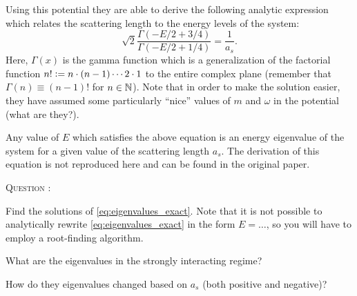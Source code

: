 \documentclass[
  a4paper,             %
  11pt,                %
  oneside,             %
  onecolumn,           %
  bibliography=totoc,  %
  final,               %
]{scrartcl}
\newcounter{question}
\newenvironment{question}{%
  \stepcounter{question}%
  \begin{tcolorbox}[
      colframe=black,
      sharp corners=all,
      boxsep=0.5ex,
    ]
    \noindent\textsc{\large Question \arabic{question}:} %
}{%
  \end{tcolorbox}%
}
\begin{document}
Using this potential they are able to derive the following analytic expression
which relates the scattering length to the energy levels of the system:
\begin{equation}
  \label{eq:eigenvalues_exact}
  \sqrt{2}\frac{\Gamma(-E/2 + 3/4)}{\Gamma(-E/2 + 1/4)} = \frac{1}{a_{s}}.
\end{equation}
Here, \(\Gamma(x)\) is the gamma function which is a generalization of the
factorial function \(n! \vcentcolon= n \cdot (n-1) \cdots 2 \cdot 1\) to the entire
complex plane (remember that \(\Gamma(n) \equiv (n - 1)!\) for \(n \in\mathbb{N}\)).
Note that in order to make the solution easier, they have assumed some
particularly \enquote{nice} values of \(m\) and \(\omega\) in the potential
(what are they?).

Any value of \(E\) which satisfies the above equation is an energy eigenvalue of
the system for a given value of the scattering length \(a_{s}\).  The derivation
of this equation is not reproduced here and can be found in the original paper.

\begin{question}
  Find the solutions of \cref{eq:eigenvalues_exact}.  Note that it is not
  possible to analytically rewrite \cref{eq:eigenvalues_exact} in the form \(E =
  \dots\), so you will have to employ a root-finding algorithm.

  What are the eigenvalues in the strongly interacting regime?

  How do they eigenvalues changed based on \(a_{s}\) (both positive and
  negative)?
\end{question}


\end{document}
